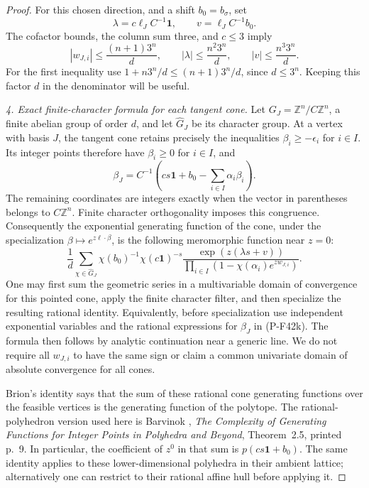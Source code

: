\documentclass[11pt,a4paper]{article}
\begin{document}
\begin{proof}
For this chosen direction, and a shift $b_0=b_\sigma$, set
\[
 \lambda=c\ell_J C^{-1}\mathbf1,\qquad
 v=\ell_J C^{-1}b_0.
\]
The cofactor bounds, the column sum three, and $c\le3$ imply
\[
 |w_{J,i}|\le\frac{(n+1)3^n}{d},\qquad
 |\lambda|\le\frac{n^2 3^n}{d},\qquad
 |v|\le\frac{n^3 3^n}{d}.
 \tag{P-F42j}
\]
For the first inequality use
$1+n3^n/d\le(n+1)3^n/d$, since $d\le3^n$.
Keeping this factor $d$ in the denominator will be useful.

\emph{4. Exact finite-character formula for each tangent cone.}
Let $G_J=\mathbb Z^n/C\mathbb Z^n$, a finite abelian group of
order $d$, and let $\widehat G_J$ be its character group.
At a vertex with basis $J$, the tangent cone retains precisely
the inequalities $\beta_i\ge-\epsilon_i$ for $i\in I$.
Its integer points therefore have $\beta_i\ge0$ for $i\in I$,
and
\[
 \beta_J=C^{-1}\left(cs\mathbf1+b_0-
                            \sum_{i\in I}\alpha_i\beta_i\right).
 \tag{P-F42k}
\]
The remaining coordinates are integers exactly when the vector
in parentheses belongs to $C\mathbb Z^n$.
Finite character orthogonality imposes this congruence.
Consequently the exponential generating function of the cone,
under the specialization $\beta\mapsto e^{z\ell\cdot\beta}$, is
the following meromorphic function near $z=0$:
\[
 \frac1d\sum_{\chi\in\widehat G_J}
 \chi(b_0)^{-1}\chi(c\mathbf1)^{-s}
 \frac{\exp(z(\lambda s+v))}
      {\prod_{i\in I}(1-\chi(\alpha_i)e^{z w_{J,i}})}.
 \tag{P-F42l}
\]
One may first sum the geometric series in a multivariable
domain of convergence for this pointed cone, apply the finite
character filter, and then specialize the resulting rational
identity. Equivalently, before specialization use independent
exponential variables and the rational expressions for
$\beta_J$ in (P-F42k). The formula then follows by analytic
continuation near a generic line. We do not require all
$w_{J,i}$ to have the same sign or claim a common univariate
domain of absolute convergence for all cones.

Brion's identity says that the sum of these rational cone
generating functions over the feasible vertices is the
generating function of the polytope. The rational-polyhedron
version used here is Barvinok \cite{CBarvinokGF}, \emph{The Complexity of
Generating Functions for Integer Points in Polyhedra and
Beyond}, Theorem~2.5, printed p.~9. In particular, the
coefficient of $z^0$ in that sum is $p(cs\mathbf1+b_0)$.
The same identity applies to these lower-dimensional
polyhedra in their ambient lattice; alternatively one can
restrict to their rational affine hull before applying it.


\end{proof}
\end{document}
